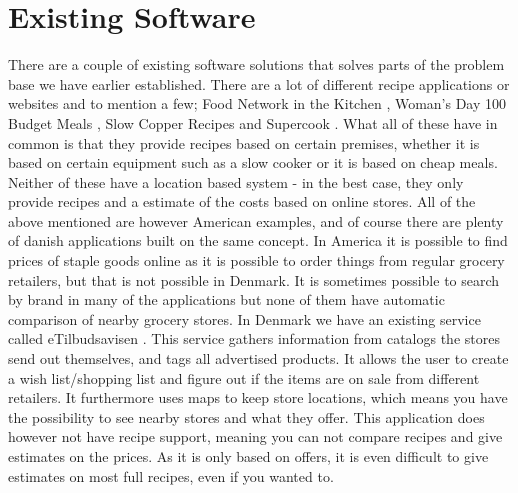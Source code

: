 \section{Existing Software}
\label{sec:exsoft}

There are a couple of existing software solutions that solves parts of the problem base we have earlier established. There are a lot of different recipe applications or websites and to mention a few; Food Network in the Kitchen \cite{recipe_FN}, Woman's Day 100 Budget Meals \cite{recipe_woman}, Slow Copper Recipes \cite{recipe_SC} and Supercook \cite{recipe_supercook}. What all of these have in common is that they provide recipes based on certain premises, whether it is based on certain equipment such as a slow cooker or it is based on cheap meals. \\
Neither of these have a location based system - in the best case, they only provide recipes and a estimate of the costs based on online stores. All of the above mentioned are however American examples, and of course there are plenty of danish applications built on the same concept. In America it is possible to find prices of staple goods online as it is possible to order things from regular grocery retailers, but that is not possible in Denmark. It is sometimes possible to search by brand in many of the applications but none of them have automatic comparison of nearby grocery stores. In Denmark we have an existing service called eTilbudsavisen \cite{etilbudsavis}. This service gathers information from catalogs the stores send out themselves, and tags all advertised products. It allows the user to create a wish list/shopping list and figure out if the items are on sale from different retailers. It furthermore uses maps to keep store locations, which means you have the possibility to see nearby stores and what they offer. This application does however not have recipe support, meaning you can not compare recipes and give estimates on the prices. As it is only based on offers, it is even difficult to give estimates on most full recipes, even if you wanted to.
